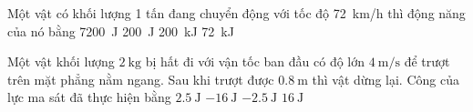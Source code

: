\begin{ex}
	Một vật có khối lượng 1 tấn đang chuyển động với tốc độ \SI{72}{\kilo\meter/\hour} thì động năng của nó bằng
	\choice
	{\SI{7200}{\joule}}
	{\SI{200}{\joule}}
	{\True \SI{200}{\kilo\joule}}
	{\SI{72}{\kilo\joule}}
	\loigiai{}
\end{ex}

\begin{ex}
	Một vật khối lượng $\SI{2}{\kilogram}$ bị hất đi với vận tốc ban đầu có độ lớn $\SI{4}{\meter / \second}$ để trượt trên mặt phẳng nằm ngang. Sau khi trượt được $\SI{0.8}{\meter}$ thì vật dừng lại. Công của lực ma sát đã thực hiện bằng
	\choice
	{$\SI{2.5}{\joule}$}
	{\True $\SI{-16}{\joule}$}
	{$\SI{-2.5}{\joule}$}
	{$\SI{16}{\joule}$}
	\loigiai{}
\end{ex}
